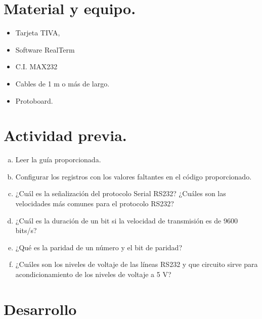 \documentclass[a4paper,11pt]{article}                 %
\begin{document}
\section{Material y equipo.}
 
\begin{itemize}
	\item Tarjeta TIVA, 
	\item Software RealTerm
	\item C.I. MAX232
	\item Cables de 1 m o más de largo. 
	\item Protoboard. 
	
\end{itemize}
  

  
\section{Actividad previa.}                   

  \begin{enumerate}[a)]
	\item Leer la guía proporcionada. 
	\item Configurar los registros con los valores faltantes en el código proporcionado. 
	\item ¿Cuál es la señalización del protocolo Serial RS232? ¿Cuáles son las velocidades más comunes para el protocolo RS232? 
	\item ¿Cuál es la duración de un bit si la velocidad de transmisión es de 9600 bits/s? 
	\item ¿Qué es la paridad de un número y el bit de paridad? 
	\item ¿Cuáles son los niveles de voltaje de las líneas RS232 y que circuito sirve para acondicionamiento de los niveles de voltaje a 5 V? 
	
	
\end{enumerate}

\section{Desarrollo}
\end{document}

